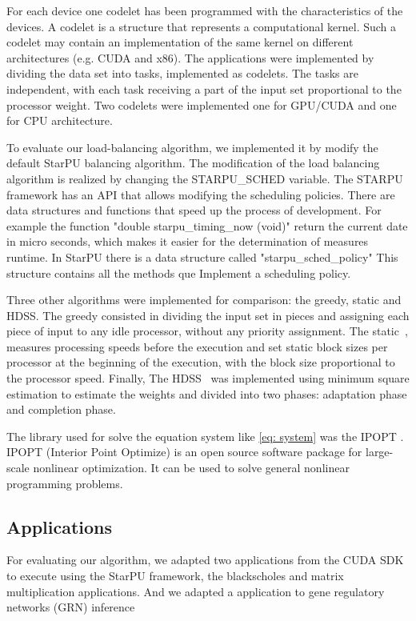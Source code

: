 \documentclass[journal]{IEEEtran}
\begin{document}
For each device one codelet has been programmed with the characteristics of the
devices. A codelet is a structure that represents a computational kernel. Such a
codelet may contain an implementation of the same kernel on different
architectures (e.g. CUDA and x86).  The applications were implemented by
dividing the data set into tasks, implemented as codelets. The tasks are
independent, with each task receiving a part of the input set proportional to
the processor weight. Two codelets were implemented one for GPU/CUDA and one for
CPU architecture.

To evaluate our load-balancing algorithm, we implemented it by modify the default StarPU balancing algorithm. The modification of the load balancing algorithm is realized by changing the STARPU\_SCHED variable. The STARPU framework has an API that allows modifying the scheduling policies. There are data structures and functions that speed up the process of development. For example the function "double starpu\_timing\_now (void)"  return the current date in micro seconds, which makes it easier for the determination of measures runtime. In StarPU there is a data structure called "starpu\_sched\_policy" This structure contains all the methods que Implement a scheduling policy. 

Three other algorithms were implemented for comparison: the greedy, static and
HDSS. The greedy consisted in dividing the input set in pieces and assigning
each piece of input to any idle processor, without any priority assignment. The
static~\cite{raphael}, measures processing speeds before the execution and set
static block sizes per processor at the beginning of the execution, with the
block size proportional to the processor speed. Finally, The HDSS~\cite{HDSS}
was implemented using minimum square estimation to estimate the weights and
divided into two phases: adaptation phase and completion phase.

The library used for solve the equation system like \ref{eq: system} was the IPOPT \cite{point}. IPOPT (Interior Point Optimize) is an open source software package for large-scale nonlinear optimization. It can be used to solve general nonlinear programming problems.

\subsection{Applications}

For evaluating our algorithm, we adapted two applications from the CUDA
SDK~\cite{cuda} to execute using the StarPU framework, the blackscholes and matrix
multiplication applications. And we adapted a application to gene regulatory networks (GRN) inference~\cite{borelli2013gene}
\end{document}

